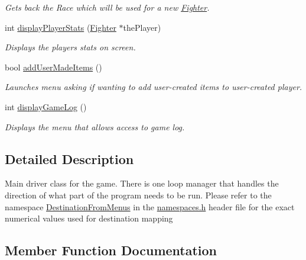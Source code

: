 \begin{DoxyCompactItemize}
\begin{DoxyCompactList}\small\item\em Gets back the Race which will be used for a new \hyperlink{class_fighter}{Fighter}. \end{DoxyCompactList}\item 
\hypertarget{class_game_loops_ad5cb6fbc3adee23b3b2384f67261a763}{}\label{class_game_loops_ad5cb6fbc3adee23b3b2384f67261a763} 
int \hyperlink{class_game_loops_ad5cb6fbc3adee23b3b2384f67261a763}{display\+Player\+Stats} (\hyperlink{class_fighter}{Fighter} $\ast$the\+Player)
\begin{DoxyCompactList}\small\item\em Displays the players stats on screen. \end{DoxyCompactList}\item 
\hypertarget{class_game_loops_a6a837278fcb4821565611a1c81f9c59d}{}\label{class_game_loops_a6a837278fcb4821565611a1c81f9c59d} 
bool \hyperlink{class_game_loops_a6a837278fcb4821565611a1c81f9c59d}{add\+User\+Made\+Items} ()
\begin{DoxyCompactList}\small\item\em Launches menu asking if wanting to add user-\/created items to user-\/created player. \end{DoxyCompactList}\item 
\hypertarget{class_game_loops_af96a5a7d5110dc04eef5f4ae6d395173}{}\label{class_game_loops_af96a5a7d5110dc04eef5f4ae6d395173} 
int \hyperlink{class_game_loops_af96a5a7d5110dc04eef5f4ae6d395173}{display\+Game\+Log} ()
\begin{DoxyCompactList}\small\item\em Displays the menu that allows access to game log. \end{DoxyCompactList}\end{DoxyCompactItemize}


\subsection{Detailed Description}
Main driver class for the game. There is one loop manager that handles the direction of what part of the program needs to be run. Please refer to the namespace \hyperlink{namespace_destination_from_menus}{Destination\+From\+Menus} in the \hyperlink{namespaces_8h}{namespaces.\+h} header file for the exact numerical values used for destination mapping 

\subsection{Member Function Documentation}
\hypertarget{class_game_loops_aeeda849e01acbbd017f46a4d9f69a9d7}{}\label{class_game_loops_aeeda849e01acbbd017f46a4d9f69a9d7} 
